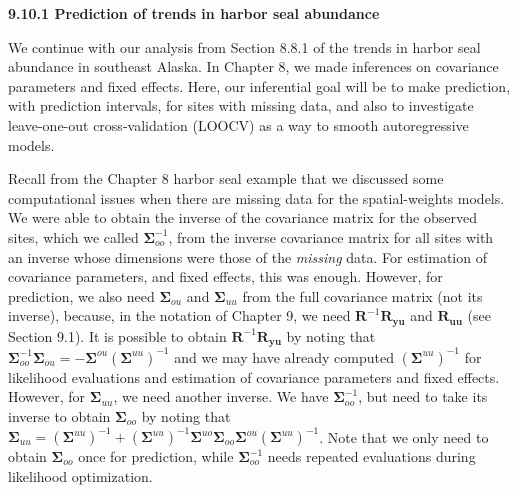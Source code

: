 \documentclass[12pt, titlepage]{article}
\begin{document}
\setcounter{equation}{0}
\renewcommand{\theequation}{R.\arabic{equation}}


%
%


\vspace{.3cm}

{\large \flushleft \textbf{9.10.1 Prediction of trends in harbor seal abundance}}

\vspace{.3cm}

We continue with our analysis from Section 8.8.1 of the trends in harbor seal abundance in southeast Alaska.  In Chapter 8, we made inferences on covariance parameters and fixed effects.  Here, our inferential goal will be to make prediction, with prediction intervals, for sites with missing data, and also to investigate leave-one-out cross-validation (LOOCV) as a way to smooth autoregressive models.

Recall from the Chapter 8 harbor seal example that we discussed some computational issues when there are missing data for the spatial-weights models.  We were able to obtain the inverse of the covariance matrix for the observed sites, which we called $\boldsymbol{\Sigma}_{oo}^{-1}$, from the inverse covariance matrix for all sites with an inverse whose dimensions were those of the \textit{missing} data.  For estimation of covariance parameters, and fixed effects, this was enough.  However, for prediction, we also need $\boldsymbol{\Sigma}_{ou}$ and $\boldsymbol{\Sigma}_{uu}$ from the full covariance matrix (not its inverse), because, in the notation of Chapter 9, we need $\mathbf{R}^{-1}\mathbf{R}_{\mathbf{y}\mathbf{u}}$ and $\mathbf{R}_{\mathbf{u}\mathbf{u}}$ (see Section 9.1). It is possible to obtain $\mathbf{R}^{-1}\mathbf{R}_{\mathbf{y}\mathbf{u}}$ by noting that $\boldsymbol{\Sigma}_{oo}^{-1}\boldsymbol{\Sigma}_{ou} = -\boldsymbol{\Sigma}^{ou} (\boldsymbol{\Sigma}^{uu})^{-1}$ and we may have already computed $(\boldsymbol{\Sigma}^{uu})^{-1}$ for likelihood evaluations and estimation of covariance parameters and fixed effects.  However, for $\boldsymbol{\Sigma}_{uu}$, we need another inverse. We have $\boldsymbol{\Sigma}_{oo}^{-1}$, but need to take its inverse to obtain $\boldsymbol{\Sigma}_{oo}$ by noting that $\boldsymbol{\Sigma}_{uu} = (\boldsymbol{\Sigma}^{uu})^{-1} + (\boldsymbol{\Sigma}^{uu})^{-1}\boldsymbol{\Sigma}^{uo} \boldsymbol{\Sigma}_{oo}\boldsymbol{\Sigma}^{ou} (\boldsymbol{\Sigma}^{uu})^{-1}$.  Note that we only need to obtain $\boldsymbol{\Sigma}_{oo}$ once for prediction, while $\boldsymbol{\Sigma}_{oo}^{-1}$ needs repeated evaluations during likelihood optimization.
\end{document}
